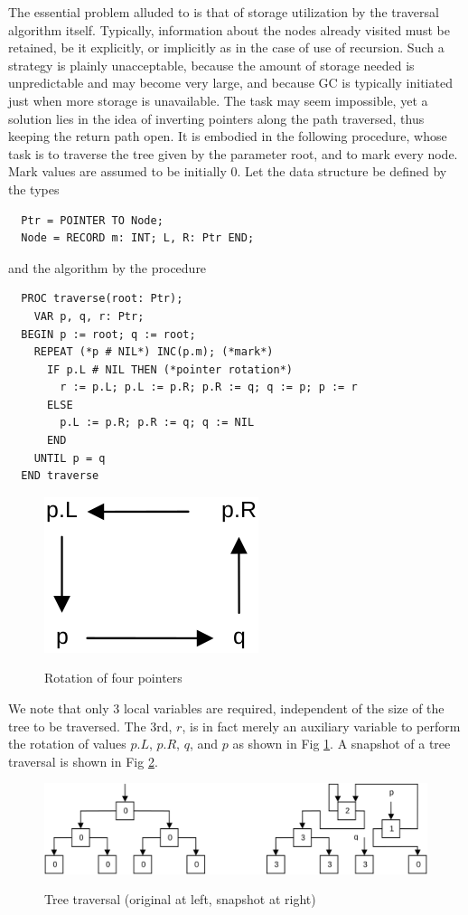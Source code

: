 The essential problem alluded to is that of storage utilization by the traversal algorithm itself.
Typically, information about the nodes already visited must be retained, be it explicitly, or
implicitly as in the case of use of recursion. Such a strategy is plainly unacceptable,
because the amount of storage needed is unpredictable and may become very large, and because
GC is typically initiated just when more storage is unavailable. The task may seem impossible,
yet a solution lies in the idea of inverting pointers along the path traversed, thus keeping
the return path open. It is embodied in the following procedure, whose task is to traverse
the tree given by the parameter root, and to mark every node. Mark values are assumed to
be initially 0. Let the data structure be defined by the types
\begin{verbatim}
  Ptr = POINTER TO Node;
  Node = RECORD m: INT; L, R: Ptr END;
\end{verbatim}
and the algorithm by the procedure
\begin{verbatim}
  PROC traverse(root: Ptr);
    VAR p, q, r: Ptr;
  BEGIN p := root; q := root;
    REPEAT (*p # NIL*) INC(p.m); (*mark*)
      IF p.L # NIL THEN (*pointer rotation*)
        r := p.L; p.L := p.R; p.R := q; q := p; p := r
      ELSE
        p.L := p.R; p.R := q; q := NIL
      END
    UNTIL p = q
  END traverse
\end{verbatim}
\begin{figure}[h!]
  \centering
  \includegraphics[width=.25\textwidth]{i/s}
  \label{fig:rotation}
  \caption{Rotation of four pointers}
\end{figure}
We note that only 3 local variables are required, independent of the size of the tree to be
traversed. The 3rd, $r$, is in fact merely an auxiliary variable to perform the rotation of
values $p.L$, $p.R$, $q$, and $p$ as shown in Fig \ref{fig:rotation}. A snapshot of a tree
traversal is shown in Fig \ref{fig:tree-traversal}.
\begin{figure}[h!]
  \centering
  \includegraphics[width=\textwidth]{i/t}
  \label{fig:tree-traversal}
  \caption{Tree traversal (original at left, snapshot at right)}
\end{figure}

